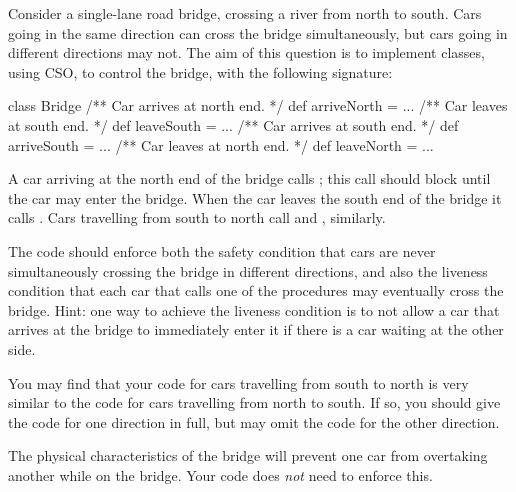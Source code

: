 \begin{question}
Consider a single-lane road bridge, crossing a river from north to south.
Cars going in the same direction can cross the bridge simultaneously, but cars
going in different directions may not.  The aim of this question is to
implement classes, using CSO, to control the bridge, with the following
signature:
%
\begin{scala}
  class Bridge{
    /** Car arrives at north end. */
    def arriveNorth = {...}
    /** Car leaves at south end. */
    def leaveSouth = {...}
    /** Car arrives at south end. */
    def arriveSouth = {...}
    /** Car leaves at north end. */
    def leaveNorth = {...}
  }
\end{scala}
%
A car arriving at the north end of the bridge calls ; this
call should block until the car may enter the bridge.  When the car leaves the
south end of the bridge it calls .  Cars travelling from
south to north call  and , similarly.

The code should enforce both the safety condition that cars are never
simultaneously crossing the bridge in different directions, and also the
liveness condition that each car that calls one of the 
procedures may eventually cross the bridge.  Hint: one way to achieve the
liveness condition is to not allow a car that arrives at the bridge to
immediately enter it if there is a car waiting at the other side.

You may find that your code for cars travelling from south to north
is very similar to the code for cars travelling from north to south.  If so,
you should give the code for one direction in full, but may omit the code for
the other direction.

The physical characteristics of the bridge will prevent one car from
overtaking another while on the bridge.  Your code does \emph{not} need to
enforce this. 

\end{question}

